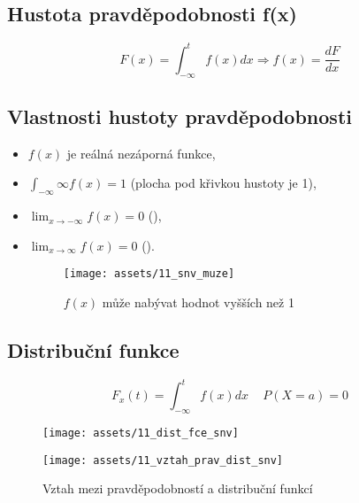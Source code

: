 \subsection{Hustota pravděpodobnosti f(x)}
\begin{equation*}
    F(x) = \int_{-\infty}^{t} f(x) dx \Rightarrow f(x) = \frac{dF}{dx}
\end{equation*}
\subsection*{Vlastnosti hustoty pravděpodobnosti}
\begin{itemize}
    \item $f(x)$ je reálná nezáporná funkce,
    \item $\int_{-\infty}{\infty} f(x) = 1$ (plocha pod křivkou hustoty je 1),
    \item $\lim_{x \to -\infty} f(x) = 0$ (),
    \item $\lim_{x \to \infty} f(x) = 0$ ().
          \begin{figure}[H]
              \centering
              \texttt{[image: assets/11\_snv\_muze]}
              \caption{$f(x)$ může nabývat hodnot vyšších než 1}
          \end{figure}
\end{itemize}
\subsection{Distribuční funkce}
$$F_x(t) = \int_{-\infty}^{t} f(x) dx\, \quad P(X = a) = 0$$
\begin{figure}[H]
    \centering
    \texttt{[image: assets/11\_dist\_fce\_snv]}
\end{figure}
\begin{figure}[H]
    \centering
    \texttt{[image: assets/11\_vztah\_prav\_dist\_snv]}
    \caption{Vztah mezi pravděpodobností a distribuční funkcí}
\end{figure}

